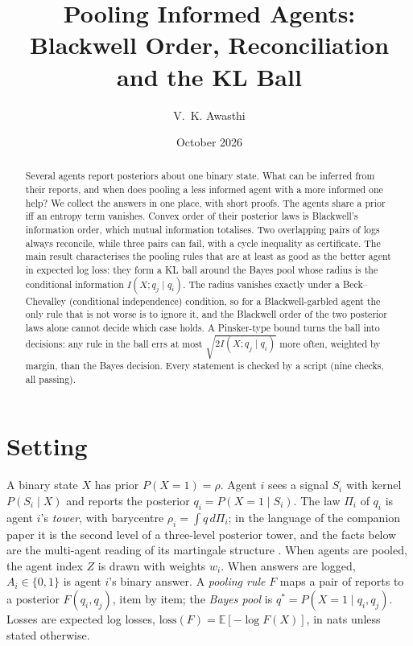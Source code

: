 \documentclass[11pt]{article}
\title{Pooling Informed Agents:\\ Blackwell Order, Reconciliation and the KL Ball}
\author{V.~K. Awasthi}
\date{October 2026}
\theoremstyle{definition}
\theoremstyle{remark}
\newcommand{\EE}{\mathbb E}
\begin{document}
\maketitle

\begin{abstract}
Several agents report posteriors about one binary state. What can be inferred from their reports, and when does pooling a less
informed agent with a more informed one help? We collect the answers in one place, with short proofs. The agents share a prior iff an
entropy term vanishes. Convex order of their posterior laws is Blackwell's information order, which mutual information totalises. Two
overlapping pairs of logs always reconcile, while three pairs can fail, with a cycle inequality as certificate. The main result
characterises the pooling rules that are at least as good as the better agent in expected log loss: they form a KL ball around the
Bayes pool whose radius is the conditional information $I(X;q_j\mid q_i)$. The radius vanishes exactly under a Beck--Chevalley
(conditional independence) condition, so for a Blackwell-garbled agent the only rule that is not worse is to ignore it, and the
Blackwell order of the two posterior laws alone cannot decide which case holds. A Pinsker-type bound turns the ball into decisions:
any rule in the ball errs at most $\sqrt{2I(X;q_j\mid q_i)}$ more often, weighted by margin, than the Bayes decision. Every statement
is checked by a script (nine checks, all passing).
\end{abstract}

\section{Setting}
A binary state $X$ has prior $P(X=1)=\rho$. Agent $i$ sees a signal $S_i$ with kernel $P(S_i\mid X)$ and reports the posterior
$q_i=P(X=1\mid S_i)$. The law $\Pi_i$ of $q_i$ is agent $i$'s \emph{tower}, with barycentre $\rho_i=\int q\,d\Pi_i$; in the language of
the companion paper \cite{Main} it is the second level of a three-level posterior tower, and the facts below are the multi-agent reading
of its martingale structure \cite[Thm.~5.3]{Main}. When agents are pooled, the agent index $Z$ is drawn with weights $w_i$. When answers
are logged, $A_i\in\{0,1\}$ is agent $i$'s binary answer. A \emph{pooling rule} $F$ maps a pair of reports to a posterior
$F(q_i,q_j)$, item by item; the \emph{Bayes pool} is $q^*=P(X=1\mid q_i,q_j)$. Losses are expected log losses,
$\mathrm{loss}(F)=\EE[-\log F(X)]$, in nats unless stated otherwise.
\end{document}
